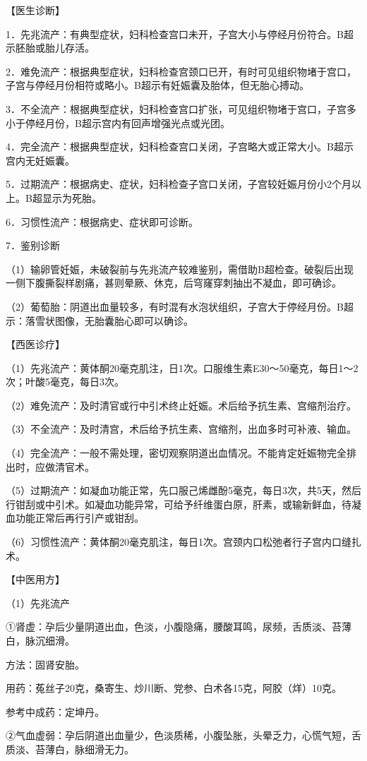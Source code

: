 \documentclass[12pt,UTF8]{ctexbook}
\begin{document}
【医生诊断】

1．先兆流产：有典型症状，妇科检查宫口未开，子宫大小与停经月份符合。B超示胚胎或胎儿存活。

2．难免流产：根据典型症状，妇科检查宫颈口已开，有时可见组织物堵于宫口，子宫与停经月份相符或略小。B超示有妊娠囊及胎体，但无胎心搏动。

3．不全流产：根据典型症状，妇科检查宫口扩张，可见组织物堵于宫口，子宫多小于停经月份，B超示宫内有回声增强光点或光团。

4．完全流产：根据典型症状，妇科检查宫口关闭，子宫略大或正常大小。B超示宫内无妊娠囊。

5．过期流产：根据病史、症状，妇科检查子宫口关闭，子宫较妊娠月份小2个月以上。B超显示为死胎。

6．习惯性流产：根据病史、症状即可诊断。

7．鉴别诊断

（1）输卵管妊娠，未破裂前与先兆流产较难鉴别，需借助B超检查。破裂后出现一侧下腹撕裂样剧痛，甚则晕厥、休克，后穹窿穿刺抽出不凝血，即可确诊。

（2）葡萄胎：阴道出血量较多，有时混有水泡状组织，子宫大于停经月份。B超示：落雪状图像，无胎囊胎心即可以确诊。

【西医诊疗】

（1）先兆流产：黄体酮20毫克肌注，日1次。口服维生素E30～50毫克，每日1～2次；叶酸5毫克，每日3次。

（2）难免流产：及时清官或行中引术终止妊娠。术后给予抗生素、宫缩剂治疗。

（3）不全流产：及时清宫，术后给予抗生素、宫缩剂，出血多时可补液、输血。

（4）完全流产：一般不需处理，密切观察阴道出血情况。不能肯定妊娠物完全排出时，应做清官术。

（5）过期流产：如凝血功能正常，先口服己烯雌酚5毫克，每日3次，共5天，然后行钳刮或中引术。如凝血功能异常，可给予纤维蛋白原，肝素，或输新鲜血，待凝血功能正常后再行引产或钳刮。

（6）习惯性流产：黄体酮20毫克肌注，每日1次。宫颈内口松弛者行子宫内口缝扎术。

【中医用方】

（1）先兆流产

①肾虚：孕后少量阴道出血，色淡，小腹隐痛，腰酸耳鸣，尿频，舌质淡、苔薄白，脉沉细滑。

方法：固肾安胎。

用药：菟丝子20克，桑寄生、炒川断、党参、白术各15克，阿胶（烊）10克。

参考中成药：定坤丹。

②气血虚弱：孕后阴道出血量少，色淡质稀，小腹坠胀，头晕乏力，心慌气短，舌质淡、苔薄白，脉细滑无力。
\end{document}
